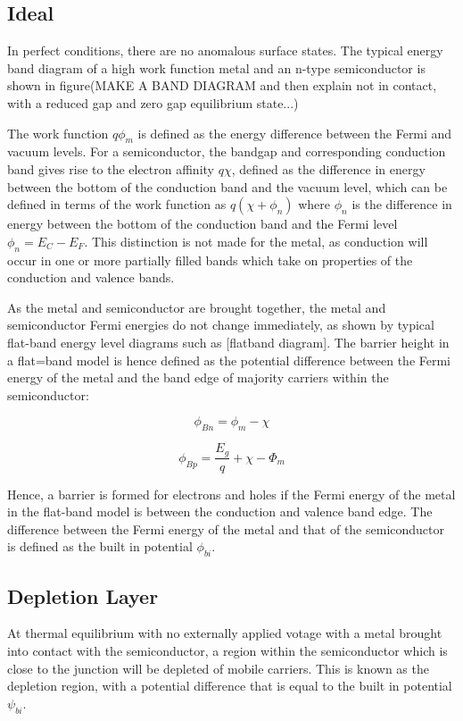 \subsection{Ideal}
In perfect conditions, there are no anomalous surface states. The typical energy band diagram of a high work function metal and an n-type semiconductor is shown in figure(MAKE A BAND DIAGRAM and then explain not in contact, with a reduced gap and zero gap equilibrium state...)

The work function $q\phi_{m}$ is defined as the energy difference between the Fermi and vacuum levels. For a semiconductor, the bandgap and corresponding conduction band gives rise to the electron affinity $q\chi$, defined as the difference in energy between the bottom of the conduction band and the vacuum level, which can be defined in terms of the work function as $q(\chi+\phi_{n})$ where $\phi_{n}$ is the difference in energy between the bottom of the conduction band and the Fermi level $\phi_{n}=E_{C}-E_{F}$. This distinction is not made for the metal, as conduction will occur in one or more partially filled bands which take on properties of the conduction and valence bands.  

As the metal and semiconductor are brought together, the metal and semiconductor Fermi energies do not change immediately, as shown by typical flat-band energy level diagrams such as [flatband diagram]. The barrier height in a flat=band model is hence defined as the potential difference between the Fermi energy of the metal and the band edge of majority carriers within the semiconductor:

\begin{equation}
    \phi_{Bn} = \phi_{m} - \chi
    \label{eq:barrier_height_ideal_n_type}
\end{equation}

\begin{equation}
    \phi_{Bp} = \frac{E_{g}}{q} + \chi - \Phi_{m}
    \label{eq:barrier_height_ideal_p_type}
\end{equation}

Hence, a barrier is formed for electrons and holes if the Fermi energy of the metal in the flat-band model is between the conduction and valence band edge. The difference between the Fermi energy of the metal and that of the semiconductor is defined as the built in potential $\phi_{bi}$.

\subsection{Depletion Layer}
At thermal equilibrium with no externally applied votage with a metal brought into contact with the semiconductor, a region within the semiconductor which is close to the junction will be depleted of mobile carriers. This is known as the depletion region, with a potential difference that is equal to the built in potential $\psi_{bi}$.

